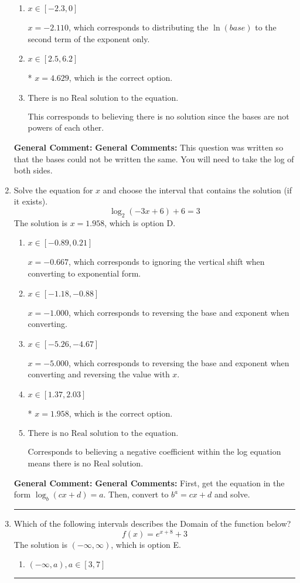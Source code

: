 \documentclass{extbook}[14pt]
\newcommand{\litem}[1]{\item #1

\rule{\textwidth}{0.4pt}}
\begin{document}
\begin{enumerate}
{\begin{enumerate}[label=\Alph*.]
$x = 1.800$, which corresponds to solving the numerators as equal while ignoring the bases are different.
\item \( x \in [-2.3, 0] \)

$x = -2.110$, which corresponds to distributing the $\ln(base)$ to the second term of the exponent only.
\item \( x \in [2.5, 6.2] \)

* $x = 4.629$, which is the correct option.
\item \( \text{There is no Real solution to the equation.} \)

This corresponds to believing there is no solution since the bases are not powers of each other.
\end{enumerate}

\textbf{General Comment:} \textbf{General Comments:} This question was written so that the bases could not be written the same. You will need to take the log of both sides.
}
\litem{
Solve the equation for $x$ and choose the interval that contains the solution (if it exists).
\[ \log_{2}{(-3x+6)}+6 = 3 \]The solution is \( x = 1.958 \), which is option D.\begin{enumerate}[label=\Alph*.]
\item \( x \in [-0.89, 0.21] \)

$x = -0.667$, which corresponds to ignoring the vertical shift when converting to exponential form.
\item \( x \in [-1.18, -0.88] \)

$x = -1.000$, which corresponds to reversing the base and exponent when converting.
\item \( x \in [-5.26, -4.67] \)

$x = -5.000$, which corresponds to reversing the base and exponent when converting and reversing the value with $x$.
\item \( x \in [1.37, 2.03] \)

* $x = 1.958$, which is the correct option.
\item \( \text{There is no Real solution to the equation.} \)

Corresponds to believing a negative coefficient within the log equation means there is no Real solution.
\end{enumerate}

\textbf{General Comment:} \textbf{General Comments:} First, get the equation in the form $\log_b{(cx+d)} = a$. Then, convert to $b^a = cx+d$ and solve.
}
\litem{
Which of the following intervals describes the Domain of the function below?
\[ f(x) = e^{x+8}+3 \]The solution is \( (-\infty, \infty) \), which is option E.\begin{enumerate}[label=\Alph*.]
\item \( (-\infty, a), a \in [3, 7] \)


\end{enumerate}}
\end{enumerate}
\end{document}
